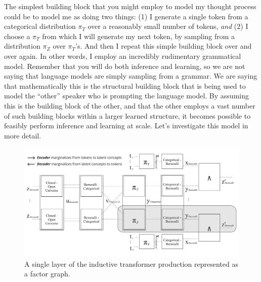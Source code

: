 \documentclass{article}
\begin{document}
The simplest building block that you might employ to model my thought process could be to model me as doing two things: (1) I generate a single token from a categorical distribution $\pi_T$ over a reasonably small number of tokens, \emph{and} (2) I choose a $\pi_T$ from which I will generate my next token, by sampling from a distribution $\pi_Z$ over $\pi_T$'s.  And then I repeat this simple building block over and over again.  In other words, I employ an incredibly rudimentary grammatical model.  Remember that you will do both inference and learning, so we are not saying that language models are simply sampling from a grammar.  We are saying that mathematically this is the structural building block that is being used to model the ``other'' speaker who is prompting the language model. By assuming this is the building block of the other, and that the other employs a vast number of such building blocks within a larger learned structure, it becomes possible to feasibly perform inference and learning at scale.   Let's investigate this model in more detail.

\begin{figure}[H]
    \includegraphics[width=\textwidth]{figures/transformer_factor_graph.pdf}
    \caption{A single layer of the inductive transformer production represented as a factor graph.}
    \label{fig:factor-graph-for-inductive-transformer}
\end{figure}
\end{document}
